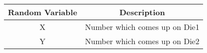 \begin{center}
	\begin{tabular}{|c|c|} 
		\hline
		Random Variable & Description \\
		\hline
		X & Number which comes up on Die1\\
		\hline
		Y & Number which comes up on Die2\\
		\hline
	\end{tabular}
\end{center}